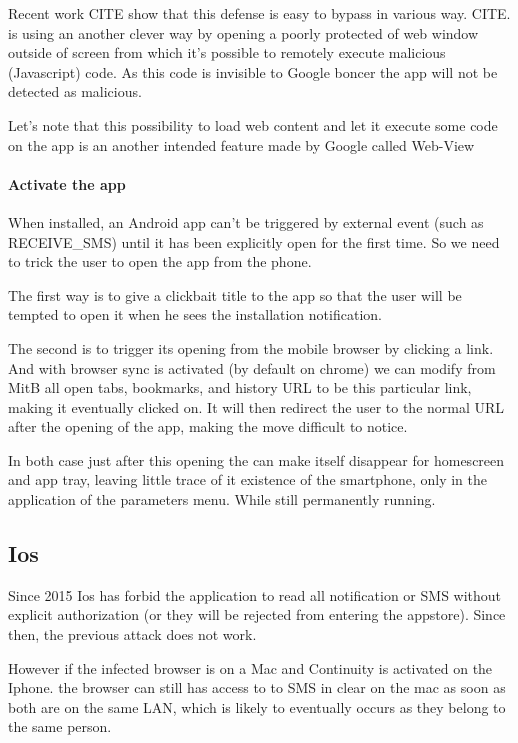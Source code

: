 \documentclass[11pt, a4paper,twocolumn]{article}
\begin{document}
Recent work CITE show that this defense is easy to bypass in various way. CITE. \cite{Base} is using an another clever way by opening a poorly protected of web window outside of screen from which it's possible to remotely execute malicious (Javascript) code. As this code is invisible to Google boncer the app will not be detected as malicious.

Let's note that this possibility to load web content and let it execute some code on the app is an another intended feature made by Google called Web-View

\paragraph{Activate the app} When installed, an Android app can't be triggered by external event (such as RECEIVE\_SMS) until it has been explicitly open for the first time. So we need to trick the user to open the app from the phone. 

The first way is to give a clickbait title to the app so that the user will be tempted to open it when he sees the installation notification.

The second is to trigger its opening from the mobile browser by clicking a link. And with browser sync is activated (by default on chrome) we can modify from MitB all open tabs, bookmarks, and history URL to be this particular link, making it eventually clicked on. It will then redirect the user to the normal URL after the opening of the app, making the move difficult to notice.

In both case just after this opening the can make itself disappear for homescreen and app tray, leaving little trace of it existence of the smartphone, only in the application of the parameters menu. While still permanently running.

\subsection{Ios}
Since 2015 Ios has forbid the application to read all notification or SMS without explicit authorization (or they will be rejected from entering the appstore). 
Since then, the previous attack does not work. 

However if the infected browser is on a Mac and Continuity is activated on the Iphone. the browser can still has access to to SMS in clear on the mac as soon as both are on the same LAN, which is likely to eventually occurs as they belong to the same person. 
\end{document}
